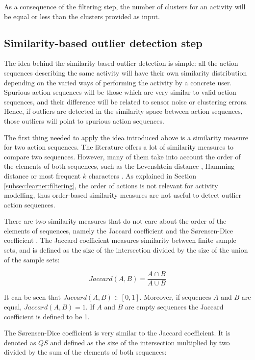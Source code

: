 As a consequence of the filtering step, the number of clusters for an activity will be equal or less than the clusters provided as input.


\subsection{Similarity-based outlier detection step}
\label{subsec:learner:outlier}
The idea behind the similarity-based outlier detection is simple: all the action sequences describing the same activity will have their own similarity distribution depending on the varied ways of performing the activity by a concrete user. Spurious action sequences will be those which are very similar to valid action sequences, and their difference will be related to sensor noise or clustering errors. Hence, if outliers are detected in the similarity space between action sequences, those outliers will point to spurious action sequences. 

The first thing needed to apply the idea introduced above is a similarity measure for two action sequences. The literature offers a lot of similarity measures to compare two sequences. However, many of them take into account the order of the elements of both sequences, such as the Levenshtein distance \cite{Levenshtein1966}, Hamming distance \cite{Hamming1950} or most frequent $k$ characters \cite{Seker2014}. As explained in Section \ref{subsec:learner:filtering}, the order of actions is not relevant for activity modelling, thus order-based similarity measures are not useful to detect outlier action sequences.

There are two similarity measures that do not care about the order of the elements of sequences, namely the Jaccard coefficient \cite{A.K.Jain1988} and the S{\o}rensen-Dice coefficient \cite{Sorensen1948}. The Jaccard coefficient measures similarity between finite sample sets, and is defined as the size of the intersection divided by the size of the union of the sample sets:

\begin{equation}
\label{eq-jaccard}
  Jaccard(A, B) = \frac{A \cap B}{A \cup B}
 \end{equation}

It can be seen that $Jaccard(A, B) \in [0, 1]$. Moreover, if sequences $A$ and $B$ are equal, $Jaccard(A, B) = 1$. If $A$ and $B$ are empty sequences the Jaccard coefficient is defined to be 1.

The S{\o}rensen-Dice coefficient is very similar to the Jaccard coefficient. It is denoted as $QS$ and defined as the size of the intersection multiplied by two divided by the sum of the elements of both sequences:

